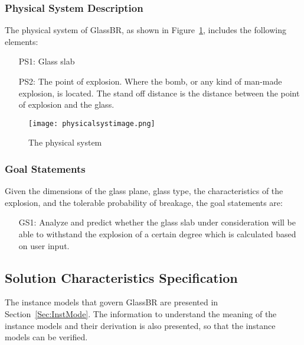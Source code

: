 \documentclass[12pt]{article}
\begin{document}
\subsubsection{Physical System Description}
\label{Sec:PhysSystDesc}
The physical system of GlassBR, as shown in Figure~\ref{Figure:Thephyssyst}, includes the following elements:
\begin{itemize}
\item[PS1:]Glass slab
\item[PS2:]The point of explosion. Where the bomb, or any kind of man-made explosion, is located. The stand off distance is the distance between the point of explosion and the glass.
\end{itemize}
\begin{figure}
\begin{center}
\texttt{[image: physicalsystimage.png]}
\caption{The physical system}
\label{Figure:Thephyssyst}
\end{center}
\end{figure}
\subsubsection{Goal Statements}
\label{Sec:GoalStat}
Given the dimensions of the glass plane, glass type, the characteristics of the explosion, and the tolerable probability of breakage, the goal statements are:
\begin{itemize}
\item[GS1:]Analyze and predict whether the glass slab under consideration will be able to withstand the explosion of a certain degree which is calculated based on user input.
\end{itemize}
\subsection{Solution Characteristics Specification}
\label{Sec:SoluCharSpec}
The instance models that govern GlassBR are presented in Section~\ref{Sec:InstMode}. The information to understand the meaning of the instance models and their derivation is also presented, so that the instance models can be verified.
\end{document}
